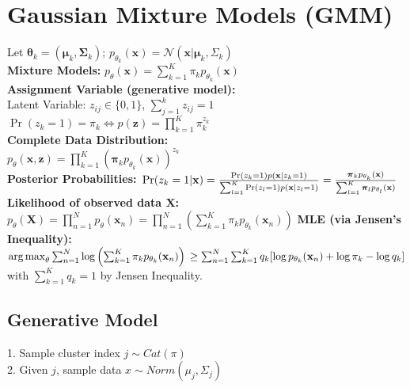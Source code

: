 \section{Gaussian Mixture Models (GMM)}
Let $\boldsymbol{\theta}_k = (\boldsymbol{\mu}_k, \boldsymbol{\Sigma}_k)$; $p_{\theta_k}(\mathbf{x}) = \mathcal{N}(\mathbf{x} | \boldsymbol{\mu}_k, \Sigma_k)$\\
\textbf{Mixture Models:} $p_\theta(\mathbf{x}) = \sum_{k=1}^K \pi_k p_{\theta_k}(\mathbf{x})$\\
\textbf{Assignment Variable (generative model):}\\
Latent Variable: $z_{ij} \in \{0, 1\}$, $\sum_{j=1}^k z_{ij} = 1$\\
$\operatorname{Pr}(z_k = 1) = \pi_k \Leftrightarrow p(\mathbf{z}) = \prod_{k=1}^K \pi_k^{z_k}$\\
\textbf{Complete Data Distribution:}\\
$p_\theta(\mathbf{x}, \mathbf{z}) = \prod_{k=1}^K \left( \boldsymbol{\pi}_k p_{\theta_k}(\mathbf{x})\right)^{z_k}$\\
\textbf{Posterior Probabilities:} $\\\operatorname{Pr}(z_k = 1 | \mathbf{x}) = \frac{\operatorname{Pr}(z_k = 1) p(\mathbf{x} | z_k = 1)}{\sum_{l=1}^K \operatorname{Pr}(z_l = 1) p(\mathbf{x} | z_l = 1)} = \frac{\boldsymbol{\pi}_k p_{\theta_k}(\mathbf{x})}{\sum_{l=1}^K \boldsymbol{\pi}_l p_{\theta_l}(\mathbf{x})}$
\textbf{Likelihood of observed data $\mathbf{X}$:}\\
$p_\theta(\mathbf{X}) = \prod_{n=1}^N p_\theta(\mathbf{x}_n) = \prod_{n=1}^N \left(\sum_{k=1}^K \pi_k p_{\theta_k}(\mathbf{x}_n)\right)$
\textbf{MLE (via Jensen's Inequality):}\\
$\operatorname*{arg\,max}_\theta\sum_{n=1}^N \log \left( \sum_{k=1}^K \pi_k p_{\theta_k}(\mathbf{x}_n)\right)\\
\ge \sum_{n=1}^N \sum_{k=1}^K{q_k[\log p_{\theta_k}(\mathbf{x}_n) + \log \pi_k - \log q_k]}$\\
with $\sum_{k=1}^K{q_k} = 1$ by Jensen Inequality.

\subsection*{Generative Model}
1. Sample cluster index $j \sim Cat(\pi)$\\
2. Given $j$, sample data $x \sim Norm(\mu_j, \Sigma_j)$


